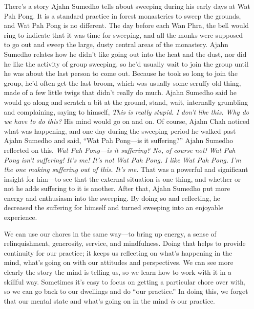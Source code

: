 There's a story Ajahn Sumedho tells about sweeping during his early 
days at Wat Pah Pong. It is a standard practice in forest monasteries 
to sweep the grounds, and Wat Pah Pong is no different. The day before 
each Wan Phra, the bell would ring to indicate that it was time for 
sweeping, and all the monks were supposed to go out and sweep the 
large, dusty central areas of the monastery. Ajahn Sumedho relates how 
he didn't like going out into the heat and the dust, nor did he like 
the activity of group sweeping, so he'd usually wait to join the group 
until he was about the last person to come out. Because he took so long 
to join the group, he'd often get the last broom, which was usually 
some scruffy old thing, made of a few little twigs that didn't really 
do much. Ajahn Sumedho said he would go along and scratch a bit at the 
ground, stand, wait, internally grumbling and complaining, saying to 
himself, \emph{This is really stupid. I don't like this. Why do we have 
to do this?} His mind would go on and on. Of course, Ajahn Chah noticed 
what was happening, and one day during the sweeping period he walked 
past Ajahn Sumedho and said, ``Wat Pah Pong---is it suffering?'' Ajahn 
Sumedho reflected on this, \emph{Wat Pah Pong---is it suffering? No, of 
course not! Wat Pah Pong isn't suffering! It's me! It's not Wat Pah 
Pong. I like Wat Pah Pong. I'm the one making suffering out of this. 
It's me.} That was a powerful and significant insight for him---to see 
that the external situation is one thing, and whether or not he adds 
suffering to it is another. After that, Ajahn Sumedho put more energy 
and enthusiasm into the sweeping. By doing so and reflecting, he 
decreased the suffering for himself and turned sweeping into an 
enjoyable experience.

We can use our chores in the same way---to bring up energy, a sense of 
relinquishment, generosity, service, and mindfulness. Doing that helps 
to provide continuity for our practice; it keeps us reflecting on 
what's happening in the mind, what's going on with our attitudes and 
perspectives. We can see more clearly the story the mind is telling us, 
so we learn how to work with it in a skillful way. Sometimes it's easy 
to focus on getting a particular chore over with, so we can go back to 
our dwellings and do ``our practice.'' In doing this, we forget that 
our mental state and what's going on in the mind \emph{is} our practice.


